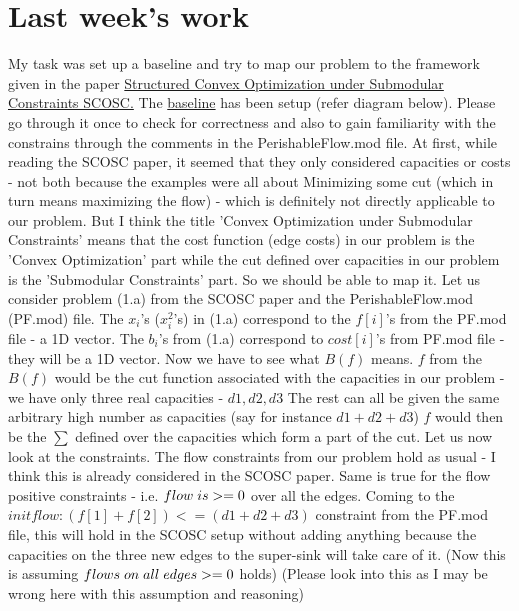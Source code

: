 \documentclass{article}
\begin{document}
\section{Last week's work}
My task was set up a baseline and try to map our problem to the framework given in the paper \href{https://dslpitt.org/uai/papers/13/p459-nagano.pdf}{Structured Convex Optimization under Submodular Constraints SCOSC.} The \href{https://github.com/Ras-al-Ghul/Perishable-Flow-Optimization/tree/master/Codes}{baseline} has been setup (refer diagram below). Please go through it once to check for correctness and also to gain familiarity with the constrains through the comments in the PerishableFlow.mod file.
\break
\break
At first, while reading the SCOSC paper, it seemed that they only considered capacities or costs - not both because the examples were all about Minimizing some cut (which in turn means maximizing the flow) - which is definitely not directly applicable to our problem. But I think the title 'Convex Optimization under Submodular Constraints' means that the cost function (edge costs) in our problem is the 'Convex Optimization' part while the cut defined over capacities in our problem is the 'Submodular Constraints' part. So we should be able to map it.
\break
\break
Let us consider problem (1.a) from the SCOSC paper and the PerishableFlow.mod (PF.mod) file. The $x_i$'s ($x_i^2$'s) in (1.a) correspond to the $f[i]$'s from the PF.mod file - a 1D vector. The $b_i$'s from (1.a) correspond to $cost[i]$'s from PF.mod file - they will be a 1D vector. Now we have to see what $B(f)$ means. $f$ from the $B(f)$ would be the cut function associated with the capacities in our problem - we have only three real capacities - $d1, d2, d3$ The rest can all be given the same arbitrary high number as capacities (say for instance $d1+d2+d3$) $f$ would then be the $\sum$ defined over the capacities which form a part of the cut.
\break
\break
Let us now look at the constraints. The flow constraints from our problem hold as usual - I think this is already considered in the SCOSC paper. Same is true for the flow positive constraints - i.e. $flow \hspace{1mm} is >= 0$ over all the edges. Coming to the $initflow: (f[1] + f[2]) <= (d1 + d2 + d3)$ constraint from the PF.mod file, this will hold in the SCOSC setup without adding anything because the capacities on the three new edges to the super-sink will take care of it. (Now this is assuming $flows \hspace{1mm} on \hspace{1mm} all \hspace{1mm} edges >= 0$ holds) (Please look into this as I may be wrong here with this assumption and reasoning)
\end{document}
